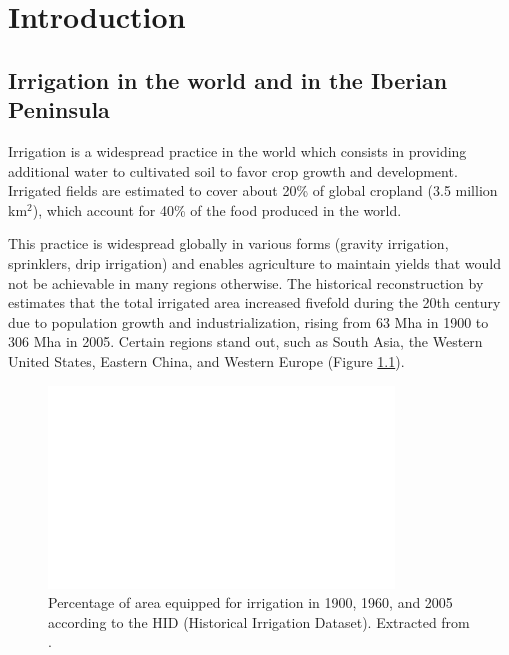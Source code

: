 \chapter{Introduction}
\label{chap:introduction}
\minitoc
\pagebreak

\section{Irrigation in the world and in the Iberian Peninsula}
Irrigation is a widespread practice in the world which consists in providing additional water to cultivated soil to favor crop growth and development.
Irrigated fields are estimated to cover about 20\% of global cropland (3.5 million km$^2$), which account for 40\% of the food produced in the world.

This practice is widespread globally in various forms (gravity irrigation, sprinklers, drip irrigation) and enables agriculture to maintain yields that would not be achievable in many regions otherwise. The historical reconstruction by \citet{siebert_global_2015} estimates that the total irrigated area increased fivefold during the 20th century due to population growth and industrialization, rising from 63 Mha in 1900 to 306 Mha in 2005. Certain regions stand out, such as South Asia, the Western United States, Eastern China, and Western Europe (Figure \ref{irrig_evolution_map}).

\begin{figure}[ht]
    \centering
    \includegraphics[width=\textwidth]{images/irrig_evolution_Siebert.png}
    \caption{Percentage of area equipped for irrigation in 1900, 1960, and 2005 according to the HID (Historical Irrigation Dataset). Extracted from \citet{siebert_global_2015}.}
    \label{irrig_evolution_map}
\end{figure}

